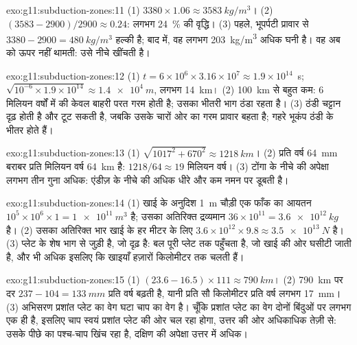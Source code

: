 \begin{solution}{exo:g11:subduction-zones:11}
(1) $3380 \times 1.06 \approx \qty{3583}{kg/m^3}$। (2)
$(3583 - 2900)/2900 \approx 0.24$: लगभग \qty{24}{\percent} की वृद्धि।
(3) पहले, भूपर्पटी प्रावार से
$3380 - 2900 = \qty{480}{kg/m^3}$ हल्की है; बाद में, वह लगभग
\qty{203}{kg/m^3} अधिक घनी है। वह अब  को ऊपर नहीं थामती: उसे नीचे खींचती है।
\end{solution}

\begin{solution}{exo:g11:subduction-zones:12}
(1) $t = 6 \times 10^6 \times 3.16 \times 10^7 \approx 1.9 \times 10^{14}$~s;
$\sqrt{10^{-6} \times 1.9 \times 10^{14}} \approx \qty{1.4e4}{m}$, लगभग
\qty{14}{km}। (2) \qty{100}{km} से बहुत कम: 6 मिलियन वर्षों में  की केवल
बाहरी परत गरम होती है; उसका भीतरी भाग ठंडा रहता है। (3) ठंडी चट्टान
दृढ़ होती है और टूट सकती है, जबकि उसके चारों ओर का गरम प्रावार बहता है; गहरे
भूकंप ठंडी  के भीतर होते हैं।
\end{solution}

\begin{solution}{exo:g11:subduction-zones:13}
(1) $\sqrt{1017^2 + 670^2} \approx \qty{1218}{km}$। (2) प्रति वर्ष \qty{64}{mm}
बराबर प्रति मिलियन वर्ष \qty{64}{km} है: $1218/64 \approx 19$ मिलियन वर्ष।
(3) टोंगा के नीचे की अपेक्षा लगभग तीन गुना अधिक: एंडीज़ के नीचे की 
अधिक धीरे और कम नमन पर डूबती है।
\end{solution}

\begin{solution}{exo:g11:subduction-zones:14}
(1) खाई के अनुदिश \qty{1}{m} चौड़ी एक फाँक का आयतन
$10^5 \times 10^6 \times 1 = \qty{1e11}{m^3}$ है; उसका अतिरिक्त द्रव्यमान
$36 \times 10^{11} = \qty{3.6e12}{kg}$ है। (2) उसका अतिरिक्त भार
खाई के हर मीटर के लिए $3.6 \times 10^{12} \times 9.8 \approx \qty{3.5e13}{N}$ है।
(3)  प्लेट के शेष भाग से जुड़ी है, जो दृढ़ है:
बल पूरी प्लेट तक पहुँचता है, जो खाई की ओर घसीटी जाती है,
और भी अधिक इसलिए कि खाइयाँ हज़ारों किलोमीटर तक चलती हैं।
\end{solution}

\begin{solution}{exo:g11:subduction-zones:15}
(1) $(23.6 - 16.5) \times 111 \approx \qty{790}{km}$। (2) \qty{790}{km} पर दर
$237 - 104 = \qty{133}{mm}$ प्रति वर्ष बढ़ती है, यानी प्रति सौ किलोमीटर प्रति वर्ष लगभग
\qty{17}{mm}। (3) अभिसरण प्रशांत प्लेट का वेग घटा चाप का वेग है।
चूँकि प्रशांत प्लेट का वेग दोनों बिंदुओं पर लगभग एक ही है, इसलिए चाप
स्वयं प्रशांत प्लेट की ओर चल रहा होगा, उत्तर की ओर अधिकाधिक तेज़ी से: उसके पीछे
का पश्च-चाप खिंच रहा है, दक्षिण की अपेक्षा उत्तर में अधिक।
\end{solution}

